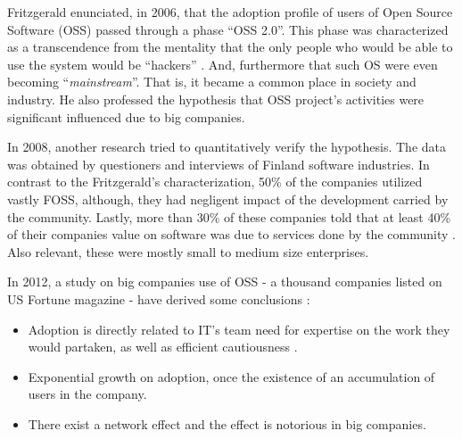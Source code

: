 \documentclass[
12pt,				%
openright,			%
oneside,			%
a4paper,			%
brazil,				%
english,			%
]{abntex2}
\begin{document}
Fritzgerald enunciated, in 2006, that the adoption profile of users of
Open Source Software (OSS) passed through a phase ``OSS 2.0''. This
phase was characterized as a transcendence from the mentality that the
only people who would be able to use the system would be ``hackers''
\cite{fitzgerald2006transformation}. And, furthermore that such OS
were even becoming ``\textit{mainstream}''. That is, it became a common
place in society and industry. He also professed the hypothesis that
OSS project's activities were significant influenced due to big companies. 

In 2008, another research tried to quantitatively verify the
hypothesis. The data was obtained by questioners and interviews of
Finland software industries. In contrast to the Fritzgerald's
characterization, 50\% of the companies utilized vastly FOSS,
although, they had negligent impact of the development carried by the
community. Lastly, more than 30\% of these companies told that at
least 40\% of their companies value on software was due to services
done by the community \cite{hauge2008adoption}. Also relevant, these
were mostly small to medium size enterprises.    

In 2012, a study on big companies use of OSS - a thousand companies listed on US
Fortune magazine - have derived some conclusions \cite{spinellis2012organizational}: 
\begin{itemize}
\item Adoption is directly related to IT's team need for expertise on
  the work they would partaken, as well as efficient cautiousness \cite{gallego2015open,
 li2013all}.
\item Exponential growth on adoption, once the existence of an
  accumulation of users in the company. 
\item There exist a network effect and the effect is notorious in big companies.  
\end{itemize}
\end{document}
